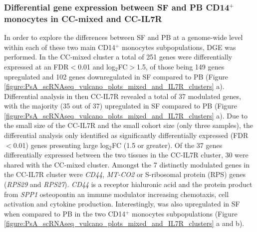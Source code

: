 \subsubsection{Differential gene expression between SF and PB CD14$^+$ monocytes in CC-mixed and CC-IL7R}
In order to explore the differences between SF and PB at a genome-wide level within each of these two main CD14$^+$ monocytes subpopulations, DGE was performed. In the CC-mixed cluster a total of 251 genes were differentially expressed at an FDR$<$0.01 and log$_2$FC$>$1.5, of those being 149 genes upregulated and 102 genes downregulated in SF compared to PB (Figure \ref{figure:PsA_scRNAseq_vulcano_plots_mixed_and_IL7R_clusters} a). Differential analysis in then CC-IL7R revealed a total of 37 modulated genes, with the majority (35 out of 37) upregulated in SF compared to PB (Figure \ref{figure:PsA_scRNAseq_vulcano_plots_mixed_and_IL7R_clusters} a). Due to the small size of the CC-IL7R and the small cohort size (only three samples), the differential analysis only identified as significantly differentially expressed (FDR$<$0.01) genes presenting large log$_2$FC (1.5 or greater). Of the 37 genes differentially expressed between the two tissues in the CC-IL7R cluster, 30 were shared with the CC-mixed cluster. Amongst the 7 distinctly modulated genes in the CC-IL7R cluster were \textit{CD44}, \textit{MT-CO2} or S-ribosomal protein (RPS) genes (\textit{RPS29} and \textit{RPS27}). \textit{CD44} is a receptor hialuronic acid and the protein product from \textit{SPP1} osteopontin an immune modulator increasing chemotaxis, cell activation and cytokine production. Interestingly,  was also upregulated in SF when compared to PB in the two CD14$^+$ monocytes subpopulations (Figure \ref{figure:PsA_scRNAseq_vulcano_plots_mixed_and_IL7R_clusters} a and b).


